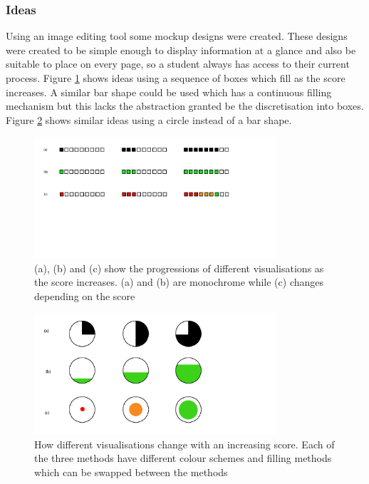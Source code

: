 \subsubsection{Ideas}
Using an image editing tool some mockup designs were created. These designs were created to be simple enough to display information at a glance and also be suitable to place on every page, so a student always has access to their current process. Figure \ref{fig:visualbar} shows ideas using a sequence of boxes which fill as the score increases. A similar bar shape could be used which has a continuous filling mechanism but this lacks the abstraction granted be the discretisation into boxes. Figure \ref{fig:visualcircles} shows similar ideas using a circle instead of a bar shape. 

\begin{figure}[h!]
\centering
\includegraphics[width=0.8\textwidth]{images/visualbar.png}
\caption{(a), (b) and (c) show the progressions of different visualisations as the score increases. (a) and (b) are monochrome while (c) changes depending on the score}
\label{fig:visualbar}
\end{figure}

\begin{figure}[h!]
\centering
\includegraphics[width=0.8\textwidth]{images/visualcircles.png}
\caption{How different visualisations change with an increasing score. Each of the three methods have different colour schemes and filling methods which can be swapped between the methods}
\label{fig:visualcircles}
\end{figure}

